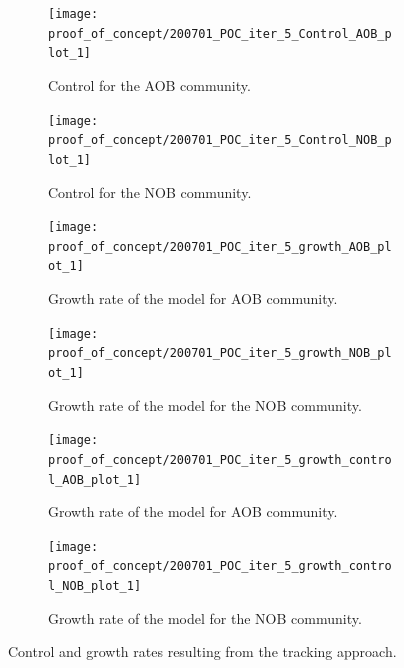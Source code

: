 \documentclass[processes,article,submit,moreauthors,pdftex]{Definitions/mdpi}
\begin{document}
\begin{figure}[h]
	\centering
	\begin{subfigure}{0.45 \linewidth}
		\texttt{[image: proof\_of\_concept/200701\_POC\_iter\_5\_Control\_AOB\_plot\_1]}
		\caption{Control for the AOB community.}
		\label{Control AOB no noise}
	\end{subfigure}
	\begin{subfigure}{0.45 \linewidth}
		\centering
		\texttt{[image: proof\_of\_concept/200701\_POC\_iter\_5\_Control\_NOB\_plot\_1]}
		\caption{Control for the NOB community.}
		\label{Control NOB no noise}
	\end{subfigure}
	
	\begin{subfigure}{0.45 \linewidth}
		\texttt{[image: proof\_of\_concept/200701\_POC\_iter\_5\_growth\_AOB\_plot\_1]}
		\caption{Growth rate of the model for AOB community.}
		\label{AOB_growth_POC}
	\end{subfigure}
	\begin{subfigure}{0.45 \linewidth}
		\centering
		\texttt{[image: proof\_of\_concept/200701\_POC\_iter\_5\_growth\_NOB\_plot\_1]}
		\caption{Growth rate of the model for the NOB community.}
		\label{NOB_growth_POC}
	\end{subfigure}
	
	\begin{subfigure}{0.45 \linewidth}
		\texttt{[image: proof\_of\_concept/200701\_POC\_iter\_5\_growth\_control\_AOB\_plot\_1]}
		\caption{Growth rate of the model for AOB community.}
		\label{AOB_growth_control_POC}
	\end{subfigure}
	\begin{subfigure}{0.45 \linewidth}
		\centering
		\texttt{[image: proof\_of\_concept/200701\_POC\_iter\_5\_growth\_control\_NOB\_plot\_1]}
		\caption{Growth rate of the model for the NOB community.}
		\label{NOB_growth_control_POC}
	\end{subfigure}
	\caption{Control and growth rates resulting from the tracking approach.}
	\label{POC_control}
\end{figure}

\end{document}
